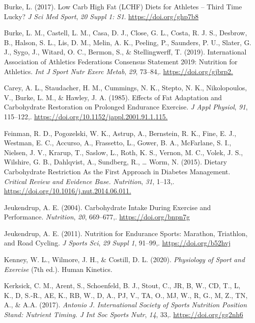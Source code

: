 \documentclass[]{cik}%
\newlength{\cslhangindent}
\newlength{\cslentryspacingunit} %
\newenvironment{CSLReferences}[2] %
 {%
  \setlength{\parindent}{0pt}
  \ifodd #1
  \let\oldpar\par
  \def\par{\hangindent=\cslhangindent\oldpar}
  \fi
  \setlength{\parskip}{#2\cslentryspacingunit}
 }%
 {}
\begin{document}
\begin{CSLReferences}{1}{0}
\leavevmode{}%
Burke, L. (2017). Low Carb High Fat (LCHF) Diets for Athletes -- Third
Time Lucky? \emph{J Sci Med Sport}, \emph{20 Suppl 1: S1}.
\url{https://doi.org/ghp7b8}

\leavevmode{}%
Burke, L. M., Castell, L. M., Casa, D. J., Close, G. L., Costa, R. J.
S., Desbrow, B., Halson, S. L., Lis, D. M., Melin, A. K., Peeling, P.,
Saunders, P. U., Slater, G. J., Sygo, J., Witard, O. C., Bermon, S., \&
Stellingwerff, T. (2019). International Association of Athletics
Federations Consensus Statement 2019: Nutrition for Athletics. \emph{Int
J Sport Nutr Exerc Metab}, \emph{29}, 73--84,.
\url{https://doi.org/gjbrp2.}

\leavevmode{}%
Carey, A. L., Staudacher, H. M., Cummings, N. K., Stepto, N. K.,
Nikolopoulos, V., Burke, L. M., \& Hawley, J. A. (1985). Effects of Fat
Adaptation and Carbohydrate Restoration on Prolonged Endurance Exercise.
\emph{J Appl Physiol}, \emph{91}, 115--122,.
\url{https://doi.org/10.1152/jappl.2001.91.1.115.}

\leavevmode{}%
Feinman, R. D., Pogozelski, W. K., Astrup, A., Bernstein, R. K., Fine,
E. J., Westman, E. C., Accurso, A., Frassetto, L., Gower, B. A.,
McFarlane, S. I., Nielsen, J. V., Krarup, T., Saslow, L., Roth, K. S.,
Vernon, M. C., Volek, J. S., Wilshire, G. B., Dahlqvist, A., Sundberg,
R., \ldots{} Worm, N. (2015). Dietary Carbohydrate Restriction As the
First Approach in Diabetes Management. \emph{Critical Review and
Evidence Base. Nutrition}, \emph{31}, 1--13,.
\url{https://doi.org/10.1016/j.nut.2014.06.011.}

\leavevmode{}%
Jeukendrup, A. E. (2004). Carbohydrate Intake During Exercise and
Performance. \emph{Nutrition}, \emph{20}, 669--677,.
\url{https://doi.org/bnpn7g}

\leavevmode{}%
Jeukendrup, A. E. (2011). Nutrition for Endurance Sports: Marathon,
Triathlon, and Road Cycling. \emph{J Sports Sci}, \emph{29 Suppl 1},
91--99,. \url{https://doi.org/b52hvj}

\leavevmode{}%
Kenney, W. L., Wilmore, J. H., \& Costill, D. L. (2020).
\emph{Physiology of Sport and Exercise} (7th ed.). Human Kinetics.

\leavevmode{}%
Kerksick, C. M., Arent, S., Schoenfeld, B. J., Stout, C., JR, B, W., CD,
T., L, K., D, S.-R., AE, K., RB, W., D, A., PJ, V., TA, O., MJ, W., R,
G., M, Z., TN, A., \& A.A. (2017). \emph{Antonio J. International
Society of Sports Nutrition Position Stand: Nutrient Timing. J Int Soc
Sports Nutr}, \emph{14}, 33,. \url{https://doi.org/gg2nh6}


\end{CSLReferences}
\end{document}
